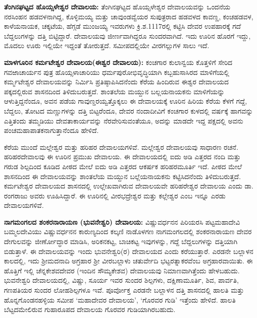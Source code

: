 \textbf{ತೆಂಗಿನಘಟ್ಟದ ಹೊಯ್ಸಳೇಶ್ವರ ದೇವಾಲಯ:} ತೆಂಗಿನಘಟ್ಟದ ಹೊಯ್ಸಳೇಶ್ವರ ದೇವಾಲಯವನ್ನು ಒಂದನೆಯ ನರಸಿಂಹನ ಹಡವಳನಾಗಿದ್ದ, ಕೊಳ್ಳಿಮಯ್ಯ ಮತ್ತು ಚಾವುಂಡವ್ವೆಯರ ಸುಪುತ್ರರಾದ ಹಡವಳದ ಕಾವಣ್ಣ, ಕಂಚಹಡವಳ, ಕಾಳೆಯನಾಯಕ, ಚಕ್ಕಟೆಯ, ಹೆಗ್ಗಡೆ ಮುಂಜಯ್ಯ ಇವರುಗಳು ಕ್ರಿ.ಶ.1117ರಲ್ಲಿ ಕಟ್ಟಿಸಿ ದೇವರ ಉಪಹಾರಕ್ಕೆ ಗದೆ ಬೆದ್ದಲುಗಳನ್ನು ದತ್ತಿ ಬಿಟ್ಟಿದ್ದಾರೆ. ದೇವಾಲಯವು ಜೀರ್ಣವಾಗಿದ್ದರೂ ಸುಂದರವಾಗಿದೆ. ಇದು ಊರಿನ ಹೊರಗೆ ಇದ್ದು, ಮೊದಲು ಊರು ಇಲ್ಲಿಯೇ ಇದ್ದಂತೆ ತೋರುತ್ತದೆ. ಸಮೀಪದಲ್ಲಿಯೇ ವೀರಗಲ್ಲುಗಳ ಸಾಲು ಇದೆ.

\textbf{ಮಾಳಗೂರಿನ ಕರ್ಮಟೇಶ್ವರ ದೇವಾಲಯ(ಈಶ್ವರ ದೇವಾಲಯ):} ಕಂಚಗಾರ ಕುಲಾನ್ವಯ ಕೊತ್ತಳಿಗೆ ಸೇರಿದ ಗವಱಾಚಾರ್ಯನ ಪುತ್ರ ಹೊಯ್ಸಳಾಚಾರಿಯು ಧರ್ಮಪುರೋಭಿವೃದ್ಧಿಯಾಗಿ ಕಬ್ಬಹುಸಾಸಿರದ ಮಾಳಿಗೆಯಲ್ಲಿ ಕರ್ಮ್ಮಟೇಶ್ವರ ದೇವಾಲಯವನ್ನು ನಿರ್ಮಿಸಿ ಪ್ರತಿಷ್ಠಾಪಿಸಿದನೆಂದು ಕೆರೆಯ ಹಿಂದಿರುವ ಈಶ್ವರ ದೇವಾಲಯದ ಪಕ್ಕದಲ್ಲಿರುವ ಶಾಸನದಿಂದ ತಿಳಿದುಬರುತ್ತದೆ. ಶಾಂತಲೆಯ ಮಯ್ದುನ ಬಲ್ಲಯನಾಯಕನು ಮಾಳಿಗೆಯನ್ನು ಆಳುತ್ತಿದ್ದನೆಂದೂ, ಅವನ ಪಡೆಯ ಗಾವುಣ್ಡರಯ್ವತ್ತೊಕ್ಕಲು ಈ ದೇವಾಲಯಕ್ಕೆ ಊರಿನ ಹಿರಿಯ ಕೆರೆಯ ಕೆಳಗೆ ಗದ್ದೆ, ಬೆದ್ದಲು, ತೋಟದ ಮಣ್ಣುಗಳನ್ನು ದತ್ತಿ ಬಿಟ್ಟರೆಂದೂ, ದೇವರ ನಂದಾದೀವಿಗೆ ಕಂಚಗಾರ ಕುಳದಲ್ಲಿ ವರ್ಷಕ್ಕೆ ಹಾಗವನ್ನು ಎತ್ತಿತಂದು ತಮ್ಮಡಿಯು ದೇವತಾಕಾರ್ಯವನ್ನು ನೆರವೇರಿಸುವಂತೆಯೂ, ಅದನ್ನು ಮಾಡದೇ ಇದ್ದ ಪಕ್ಷದಲ್ಲಿ ಅವನು ಪಂಚಮಹಾಪಾತಕನಾಗುತ್ತಾನೆಂದೂ ಹೇಳಿದೆ.

ಕೆರೆಯ ಮುಂದೆ ಮಲ್ಲೇಶ್ವರ ಮತ್ತು ಹರಿಹರ ದೇವಾಲಯಗಳಿವೆ. ಮಲ್ಲೇಶ್ವರ ದೇವಾಲಯವು ಸಾಧಾರಣ ರಚನೆ. ಹರಿಹರದೇವಾಲವು ಈ ಊರಿನ ಪ್ರಮುಖ ದೇವಾಲಯ. ಈ ದೇವಾಲಯದಲ್ಲಿ ಐದು ಅಡಿ ಎತ್ತರದ ನಂದಿ ಮತ್ತು ಗರುಡ ಶಿಲ್ಪದಿಂದ ಕೂಡಿದ ಪೀಠದ ಮೇಲೆ ಐದು ಅಡಿ ಎತ್ತರದ ಆಕರ್ಷಕ ಹರಿಹರಮೂರ್ತಿ ಇದೆ. ಪೀಠದ ಮೇಲೆ ಶಾಸನದಿಂದ ಈ ದೇವಾಲಯವನ್ನು ಶಾಂತಲೆಯ ಮಯ್ದುನ ಬಲ್ಲೆಯನಾಯಕನು ಕಟ್ಟಿಸಿದನೆಂದು ತಿಳಿದುಬರುತ್ತದೆ. ಕರ್ಮಟೇಶ್ವರ ದೇವಾಲಯದ ಶಾಸನದಲ್ಲಿ ಉಲ್ಲೇಖವಾಗಿರುವ ದೇವಾಲಯವೇ ಹರಿಹರೇಶ್ವರ ದೇವಾಲಯ ಎಂದು ಡಾ. ರಂಗರಾಜು ಅವರು ಊಹಿಸಿದ್ದಾರೆ. ಈ ಊರಿನಲ್ಲಿ ವೀರಭದ್ರೇಶ್ವರ ಮತ್ತು ಕಲ್ಲೇಶ್ವರ ಎಂಬ ಇನ್ನೂ ಎರಡು ದೇವಾಲಯಗಳಿವೆ.

\textbf{ನಾಗಮಂಗಲದ ಶಂಕರನಾರಾಯಣ (ಭುವನೇಶ್ವರಿ) ದೇವಾಲಯ:} ವಿಷ್ಣುವರ್ಧನನ ಪಿರಿಯರಸಿ ಪಟ್ಟಮಹಾದೇವಿ ಬಮ್ಮಲದೇವಿಯು ವಿಷ್ಣುವರ್ಧನನ ಕಾರುಣ್ಯದಿಂದ ಕಲ್ಕಣಿ ನಾಡೊಳಗಣ ನಾಗಮಂಗಲದಲ್ಲಿ ಶಂಕರನಾರಾಯಣ ದೇವರ ದೇಗುಲವನ್ನು ಜೀರ್ಣೋದ್ಧಾರ ಮಾಡಿಸಿ, ಅರಿಕನಕಟ್ಟ, ಬಾಚಿಕಟ್ಟ ಇವುಗಳನ್ನು, ಗದ್ದೆ ಬೆದ್ದಲುಗಳನ್ನು ದತ್ತಿಯಾಗಿ ಬಿಡುತ್ತಾಳೆ. ಈ ದೇವಾಲಯವನ್ನು ಇಂದು ಭುವನೇಶ್ವರಿ(ರ) ದೇವಾಲಯದ ಎಂದು ಕರೆಯುತ್ತಾರೆ. ಎರಡನೇ ಬಲ್ಲಾಳನ ಕಾಲದಲ್ಲಿ, ಇದು ಶ‍್ರೀಮದನಾದಿ ಅಗ್ರಹಾರ ಶ‍್ರೀ ವೀರಬಲ್ಲಾಳು ಚತುರ್ವೇದಿ ಭಟ್ಟರತ್ನಾಕರವೆಂಬ ಅಗ್ರಹಾರವಾಯಿತು. ಈ ಹೊತ್ತಿಗೆ ಇಲ್ಲಿ ಚೆನ್ನಕೇಶವದೇವರ (ಇಂದಿನ ಸೌಮ್ಯಕೇಶವ) ದೇವಾಲಯವು ನಿಮಾಣವಾಗಿತ್ತೆಂದು ಹೇಳಬಹುದು. ಭುವನೇಶ್ವರಿ ದೇವಾಲಯದಲ್ಲಿ, ವಿಷ್ಣು, ಸೂರ್ಯ ಇವರ ಸುಂದರ ಶಿಲ್ಪಗಳು, ದಕ್ಷಿಣಾಮೂರ್ತಿ, ಶಿವ, ಪಾರ್ವತಿ, ಗಣಪತಿಯರ ಸುಂದರ ಲೋಹಶಿಲ್ಪಗಳೂ ಇವೆ. ಪೂರ್ವೋಕ್ತ ಎರಡನೇ ಬಲ್ಲಾಳನ ದತ್ತಿ ಶಾಸನದಲ್ಲಿ ಹಾಲತಿ ಮತ್ತು ಹೊನ್ನಗೊಂಡನಹಳ್ಳಿಯ ಸಮೀಪ ‘ಮಹಾದೇವರ ದೇವಾಲಯ’, ‘ಗೊರವರ ಗುಡಿ’ ಇತ್ತೆಂದು ಹೇಳಿದೆ. ಹಾಲತಿ ಬೆಟ್ಟದಮೇಲಿರುವ ಗುಹಾರೂಪದ ದೇವಾಲಯ ಗೊರವರ ಗುಡಿಯಾಗಿರಬಹುದು. 

